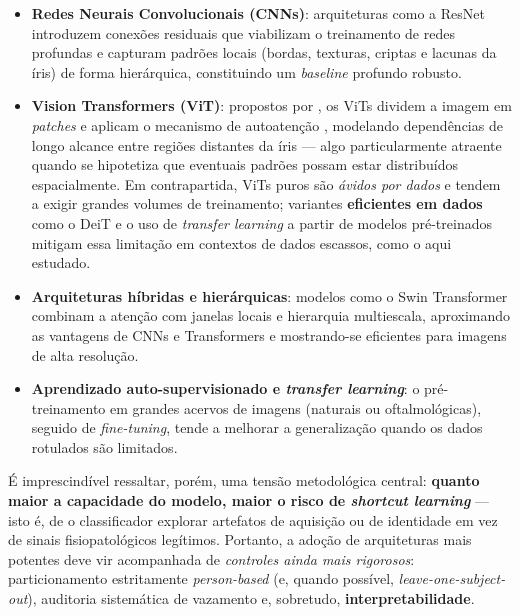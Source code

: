 \documentclass[11pt,a4paper]{article}
\begin{document}
\begin{itemize}
    \item \textbf{Redes Neurais Convolucionais (CNNs)}: arquiteturas como a ResNet
    \citep{he2016resnet} introduzem conexões residuais que viabilizam o treinamento de redes
    profundas e capturam padrões locais (bordas, texturas, criptas e lacunas da íris) de forma
    hierárquica, constituindo um \textit{baseline} profundo robusto.

    \item \textbf{Vision Transformers (ViT)}: propostos por \citet{dosovitskiy2021vit}, os ViTs
    dividem a imagem em \textit{patches} e aplicam o mecanismo de autoatenção
    \citep{vaswani2017attention}, modelando dependências de longo alcance entre regiões distantes
    da íris --- algo particularmente atraente quando se hipotetiza que eventuais padrões possam
    estar distribuídos espacialmente. Em contrapartida, ViTs puros são \emph{ávidos por dados} e
    tendem a exigir grandes volumes de treinamento; variantes \textbf{eficientes em dados} como o
    DeiT \citep{touvron2021deit} e o uso de \textit{transfer learning} a partir de modelos
    pré-treinados mitigam essa limitação em contextos de dados escassos, como o aqui estudado.

    \item \textbf{Arquiteturas híbridas e hierárquicas}: modelos como o Swin Transformer
    \citep{liu2021swin} combinam a atenção com janelas locais e hierarquia multiescala,
    aproximando as vantagens de CNNs e Transformers e mostrando-se eficientes para imagens de
    alta resolução.

    \item \textbf{Aprendizado auto-supervisionado e \textit{transfer learning}}: o
    pré-treinamento em grandes acervos de imagens (naturais ou oftalmológicas), seguido de
    \textit{fine-tuning}, tende a melhorar a generalização quando os dados rotulados são
    limitados.
\end{itemize}

É imprescindível ressaltar, porém, uma tensão metodológica central: \textbf{quanto maior a
capacidade do modelo, maior o risco de \textit{shortcut learning}} --- isto é, de o classificador
explorar artefatos de aquisição ou de identidade em vez de sinais fisiopatológicos legítimos.
Portanto, a adoção de arquiteturas mais potentes deve vir acompanhada de \emph{controles ainda
mais rigorosos}: particionamento estritamente \textit{person-based} (e, quando possível,
\textit{leave-one-subject-out}), auditoria sistemática de vazamento e, sobretudo,
\textbf{interpretabilidade}.
\end{document}
